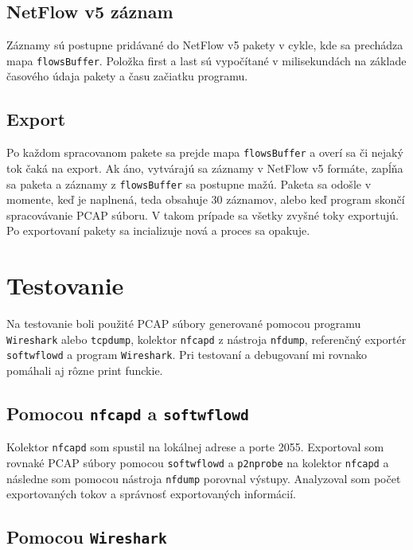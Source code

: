 \documentclass[11pt, a4paper]{article}
\begin{document}
\subsection*{NetFlow v5 záznam}

Záznamy sú postupne pridávané do NetFlow v5 pakety v cykle, kde sa prechádza mapa \texttt{flowsBuffer}.
Položka first a last sú vypočítané v milisekundách na základe časového údaja pakety a času začiatku programu.

\subsection*{Export}

Po každom spracovanom pakete sa prejde mapa \texttt{flowsBuffer} a overí sa či nejaký tok čaká na export.
Ak áno, vytvárajú sa záznamy v NetFlow v5 formáte, zapĺňa sa paketa a záznamy z 
\texttt{flowsBuffer} sa postupne mažú. Paketa sa odošle v momente, keď je naplnená, 
teda obsahuje 30 záznamov, alebo keď program skončí spracovávanie PCAP súboru. V takom 
prípade sa všetky zvyšné toky exportujú. Po exportovaní pakety sa incializuje nová a 
proces sa opakuje.

\section{Testovanie}
Na testovanie boli použité  PCAP súbory generované pomocou programu \texttt{Wireshark} 
alebo \texttt{tcpdump}, kolektor \texttt{nfcapd} z nástroja \texttt{nfdump}, 
referenčný exportér \texttt{softwflowd} a program \texttt{Wireshark}. Pri testovaní a debugovaní
mi rovnako pomáhali aj rôzne print funckie.

\subsection*{Pomocou \texttt{nfcapd} a \texttt{softwflowd}}

Kolektor \texttt{nfcapd} som spustil na lokálnej adrese a porte 2055.
Exportoval som rovnaké PCAP súbory pomocou \texttt{softwflowd} a \texttt{p2nprobe} na 
kolektor \texttt{nfcapd} a následne som pomocou nástroja \texttt{nfdump} porovnal výstupy.
Analyzoval som počet exportovaných tokov a správnosť exportovaných informácií.

\subsection*{Pomocou \texttt{Wireshark}}
\end{document}
